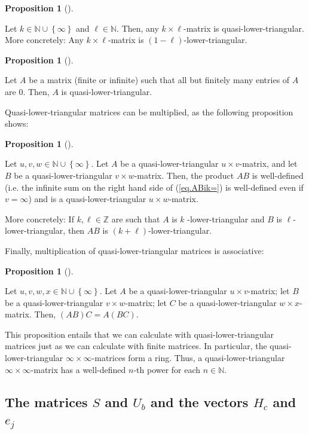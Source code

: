 \documentclass[numbers=enddot,12pt,final,onecolumn,notitlepage]{scrartcl}%
\theoremstyle{definition}
\newtheorem{prop}[theo]{Proposition}
\newenvironment{proposition}[1][]
{\begin{prop}[#1]\begin{leftbar}}
{\end{leftbar}\end{prop}}
\begin{document}
\begin{proposition}
Let $k\in\mathbb{N}\cup\left\{  \infty\right\}  $ and $\ell\in\mathbb{N}$.
Then, any $k\times\ell$-matrix is quasi-lower-triangular. More concretely: Any
$k\times\ell$-matrix is $\left(  1-\ell\right)  $-lower-triangular.
\end{proposition}

\begin{proposition}
Let $A$ be a matrix (finite or infinite) such that all but finitely many
entries of $A$ are $0$. Then, $A$ is quasi-lower-triangular.
\end{proposition}

Quasi-lower-triangular matrices can be multiplied, as the following
proposition shows:

\begin{proposition}
Let $u,v,w\in\mathbb{N}\cup\left\{  \infty\right\}  $. Let $A$ be a
quasi-lower-triangular $u\times v$-matrix, and let $B$ be a
quasi-lower-triangular $v\times w$-matrix. Then, the product $AB$ is
well-defined (i.e. the infinite sum on the right hand side of (\ref{eq.ABik=})
is well-defined even if $v=\infty$) and is a quasi-lower-triangular $u\times
w$-matrix.

More concretely: If $k,\ell\in\mathbb{Z}$ are such that $A$ is $k$%
-lower-triangular and $B$ is $\ell$-lower-triangular, then $AB$ is $\left(
k+\ell\right)  $-lower-triangular.
\end{proposition}

Finally, multiplication of quasi-lower-triangular matrices is associative:

\begin{proposition}
Let $u,v,w,x\in\mathbb{N}\cup\left\{  \infty\right\}  $. Let $A$ be a
quasi-lower-triangular $u\times v$-matrix; let $B$ be a quasi-lower-triangular
$v\times w$-matrix; let $C$ be a quasi-lower-triangular $w\times x$-matrix.
Then, $\left(  AB\right)  C=A\left(  BC\right)  $.
\end{proposition}

This proposition entails that we can calculate with quasi-lower-triangular
matrices just as we can calculate with finite matrices. In particular, the
quasi-lower-triangular $\infty\times\infty$-matrices form a ring. Thus, a
quasi-lower-triangular $\infty\times\infty$-matrix has a well-defined $n$-th
power for each $n\in\mathbb{N}$.

\subsection{The matrices $S$ and $U_{b}$ and the vectors $H_{c}$ and $e_{j}$}
\end{document}
